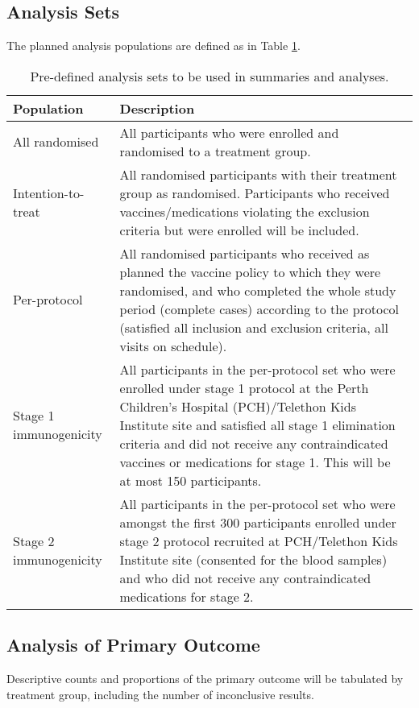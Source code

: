 \documentclass{bmcart}
\begin{document}
\subsection*{Analysis Sets}

The planned analysis populations are defined as in Table \ref{tab:analysis-sets}.

\begin{table}[!ht]
	\caption{Pre-defined analysis sets to be used in summaries and analyses.}
	\label{tab:analysis-sets}
	\begin{tabular}{lp{8cm}}
		Population & Description \\ \hline
		All randomised & All participants who were enrolled and randomised to a treatment group. \\
		Intention-to-treat & All randomised participants with their treatment group as randomised. Participants who received vaccines/medications violating the exclusion criteria but were enrolled will be included. \\
		Per-protocol & All randomised participants who received as planned the vaccine policy to which they were randomised, and who completed the whole study period (complete cases) according to the protocol (satisfied all inclusion and exclusion criteria, all visits on schedule).
		\\
		Stage 1 immunogenicity & All participants in the per-protocol set who were enrolled under stage 1 protocol at the Perth Children's Hospital (PCH)/Telethon Kids Institute site and satisfied all stage 1 elimination criteria and did not receive any contraindicated vaccines or medications for stage 1. This will be at most 150 participants. \\
		Stage 2 immunogenicity & All participants in the per-protocol set who were amongst the first 300 participants enrolled under stage 2 protocol recruited at PCH/Telethon Kids Institute site (consented for the blood samples) and who did not receive any contraindicated medications for stage 2. \\
		\hline
	\end{tabular}
\end{table}

\subsection*{Analysis of Primary Outcome}

Descriptive counts and proportions of the primary outcome will be tabulated by treatment group, including the number of inconclusive results.
\end{document}
